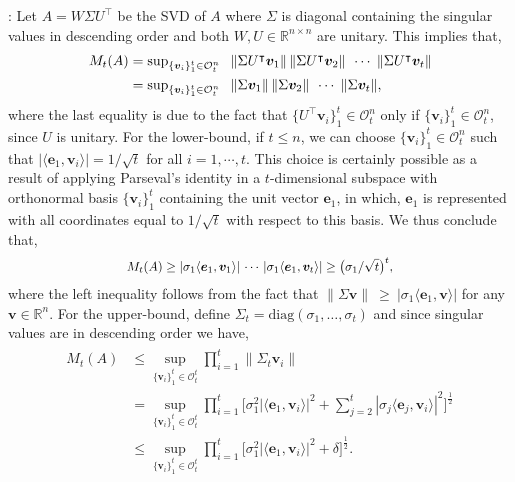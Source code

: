 \documentclass[journal]{IEEEtran}
\theoremstyle{definition}
\theoremstyle{remark}
\def\v{{\bm v}}
\newcommand \e{{\bm e}}
\newcommand\scalemath[2]{\scalebox{#1}{\mbox{\ensuremath{\displaystyle #2}}}}
\begin{document}
\vspace{-0.5cm}
:
\label{app:proof-Mbound}
		Let $A = W \Sigma U^\intercal$ be the \ac{SVD} of $A$ where $\Sigma$ is diagonal containing the singular values in descending order and both $W,U \in \mathbb{R}^{n\times n}$ are unitary.
		This implies that,
		\begin{align*}
		M_t(A) &\textstyle = \sup_{\{\v_i\}_1^t \in \mathcal{O}_t^n} \hspace{2mm} \|\Sigma U^\intercal \v_1\| \, \|\Sigma U^\intercal \v_2\| \, \hspace{1mm}\cdots \hspace{1mm}  \|\Sigma U^\intercal \v_t\| \\
		&\textstyle = \sup_{\{\v_i\}_1^t \in \mathcal{O}_t^n} \hspace{2mm} \|\Sigma \v_1\| \, \|\Sigma \v_2\| \, \hspace{1mm}\cdots \hspace{1mm}  \|\Sigma \v_t\| ,
		\end{align*}
		where the last equality is due to the fact that $\{U^\intercal \v_i\}_1^t \in \mathcal{O}_t^n$ only if $\{\v_i\}_1^t \in \mathcal{O}_t^n$, since $U$ is unitary.
		For the lower-bound, if $t \leq n$, we can choose $\{\v_i\}_1^t \in \mathcal{O}_t^n$ such that $|\langle \e_1, \v_i \rangle| = 1/\sqrt{t}$ for all $i=1,\cdots,t$.
		This choice is certainly possible as a result of applying Parseval's identity in a $t$-dimensional subspace with orthonormal basis $\{\v_i\}_1^t$ containing the unit vector $\e_1$, in which, $\e_1$ is represented with all coordinates equal to $1/\sqrt{t}$ 
		with respect to this basis.
		We thus conclude that,
		\begin{equation*}
		\scalemath{0.9}{
		M_t(A) \geq |\sigma_1 \langle \e_1, \v_1 \rangle| \, \cdots \, |\sigma_1 \langle \e_1, \v_t \rangle| \geq \big( {\sigma_1}/{\sqrt{t}} \big)^t ,}
		\end{equation*}
		where the left inequality follows from the fact that $\|\Sigma \v\|~\geq~ |\sigma_1 \langle \e_1, \v \rangle|$ for any $\v \in \mathbb{R}^n$.
		For the upper-bound, define $\Sigma_t = \mathrm{diag}(\sigma_1, \dots, \sigma_t)$ and since singular values are in descending order we have,
		\begin{gather*}
		\begin{aligned}
		M_t(A)& \textstyle \leq \sup_{\{\v_i\}_1^t\in \mathcal{O}_t^t} \prod_{i=1}^t \|\Sigma_t \v_i \| \\
		&\textstyle = \sup_{\{\v_i\}_1^t\in \mathcal{O}_t^t} \prod_{i=1}^t \Big[ \sigma_1^2\left|\langle \e_1, \v_i \rangle\right|^2 + \sum_{j=2}^t \left|\sigma_j \langle \e_j, \v_i \rangle\right|^2 \Big]^{\frac{1}{2}}\\
		& \textstyle \leq \sup_{\{\v_i\}_1^t\in \mathcal{O}_t^t} \prod_{i=1}^t \Big[\sigma_1^2\left|\langle \e_1, \v_i \rangle\right|^2 + \delta \Big]^{\frac{1}{2}} .
		\end{aligned}
		\end{gather*}
\end{document}
